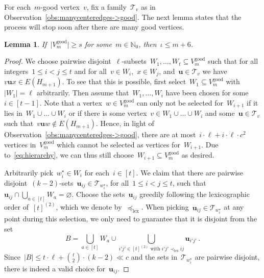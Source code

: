 \documentclass[oneside, 12pt]{amsart}
\numberwithin{equation}{section}
\numberwithin{figure}{section}
\let\emptyset=\varnothing
\newcommand{\cT}{\mathcal{T}}
\theoremstyle{plain}
\newtheorem{lemma}[theorem]{Lemma}
\theoremstyle{note}
\theoremstyle{remark}
\begin{document}
    For each~$m$-good vertex~$v$, fix a family~$\cT_v$ as in Observation~\ref{obs:manycenteredges->good}.
    The next lemma states that the process will stop soon after there are many good vertices.
    
	\begin{lemma} \label{lem:good+6}
		If~$\vert V_m^{\text{good}}\vert\geq s$ for some~$m\in\mathds{N}_0$, then~$\iota\leq m+6$.
	\end{lemma}
	
	\begin{proof}
		
		We choose pairwise disjoint~$\ell$-subsets~$W_1, \ldots, W_t \subseteq V_m^{\text{good}}$ such that for all integers~$1\leq i<j\leq t$ and for all~$v\in W_i$,~$x\in W_j$, and~$\mathbf{u}\in\cT_v$ we have $v\mathbf{u} x\in E(H_{m+1})$.
		To see that this is possible, first select~$W_1\subseteq V_m^{\text{good}}$ with~$\vert W_1\vert=\ell$ arbitrarily.
		Then assume that~$W_1,\dots, W_{i}$ have been chosen for some~$i\in[t-1]$.
		Note that a vertex~$w\in V_m^\text{good}$ can only not be selected for~$W_{i+1}$ if it lies in~$W_1\cup\dots\cup W_i$ or if there is some vertex~$v\in W_1\cup\dots\cup W_i$ and some~$\mathbf{u}\in \cT_v$ such that~$v\mathbf{u}w\notin E(H_{m+1})$.
        Hence, in light of Observation~\ref{obs:manycenteredges->good}, there are at most~$i\cdot \ell+i\cdot \ell\cdot c^2$ vertices in~$V_m^\text{good}$ which cannot be selected as vertices for~$W_{i+1}$.
		Due to~\eqref{eq:hierarchy}, we can thus still choose~$W_{i+1}\subseteq V_m^{\text{good}}$ as desired.
		
		Arbitrarily pick~$w_i^\star \in W_i$ for each~$i \in [t]$.
		We claim that there are pairwise disjoint~$(k-2)$-sets~$\mathbf{u}_{ij}\in\cT_{w_i^\star}$, for all~$1\leq i<j\leq t$, such that~$\mathbf{u}_{ij}\cap\bigcup_{a\in[t]}W_a=\emptyset$.
		Choose the sets~$\mathbf{u}_{ij}$ greedily following the lexicographic order of~$[t]^{(2)}$, which we denote by~$\preceq_{\text{lex}}$. 
		When picking~$\mathbf{u}_{ij}\in\cT_{w_i^\star}$ at any point during this selection, we only need to guarantee that it is disjoint from the set $$B=\bigcup_{a\in[t]}W_a\cup\bigcup_{i'j'\in[t]^{(2)}\text{ with }i'j'\prec_{\text{lex}} ij}\mathbf{u}_{i'j'}\,.$$
		Since~$\vert B\vert\leq t\cdot\ell+\binom{t}{2}\cdot(k-2)\ll c$ and the sets in~$\cT_{w_i^\star}$ are pairwise disjoint, there is indeed a valid choice for~$\mathbf{u}_{ij}$.
		

\end{proof}
\end{document}
